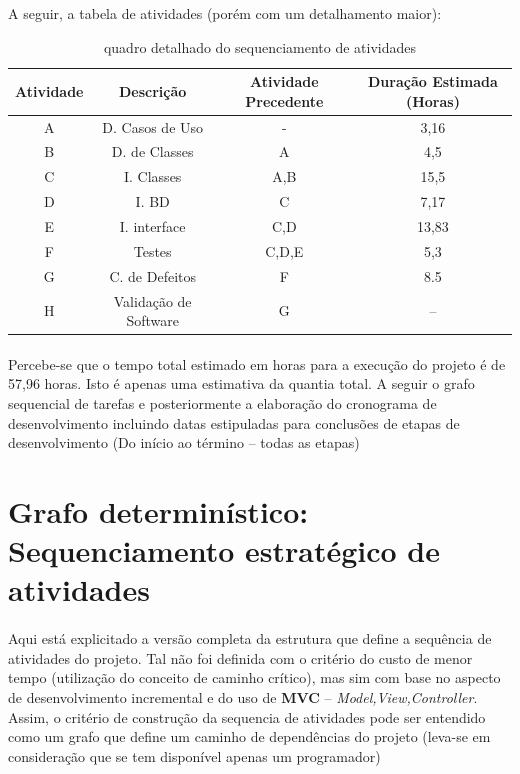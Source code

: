\documentclass[12pt,a4paper]{article}
\begin{document}
		
		A seguir, a tabela de atividades (porém com um detalhamento maior): 
		
		
		\begin{table}[!ht]
				\centering
				\begin{tabular}{|c|c|c|c|}
					\hline 
					Atividade & Descrição& Atividade Precedente & Duração Estimada (Horas) \\ 
					\hline 
					A & D. Casos de Uso & - & 3,16 \\ 
					\hline 
					B & D. de Classes& A & 4,5 \\         
					\hline 
					C & I. Classes& A,B & 15,5 \\ 
					\hline 
					D & I. BD& C & 7,17 \\ 
					\hline 
					E & I. interface & C,D & 13,83 \\ 
					\hline 	
					F & Testes & C,D,E &  5,3 \\
					\hline
					G & C. de Defeitos & F & 8.5 \\
					\hline 
					H & Validação de Software & G & -- \\ \hline 
					
				\end{tabular}	
				\caption{quadro detalhado do sequenciamento de atividades}
		\end{table}
		\paragraph{} Percebe-se que o tempo total estimado em horas para a execução do projeto é de 57,96 horas. Isto é apenas uma estimativa da quantia total. A seguir o grafo sequencial de tarefas e posteriormente a elaboração do cronograma de desenvolvimento incluindo datas estipuladas para conclusões de etapas de desenvolvimento (Do início ao término -- todas as etapas)
		
		\section{Grafo determinístico: Sequenciamento estratégico de atividades}
		\paragraph{} Aqui está explicitado a versão completa da estrutura que define a sequência de atividades do projeto. Tal não foi definida com o critério do custo de menor tempo (utilização do conceito de caminho crítico), mas sim com base no aspecto de desenvolvimento incremental e do uso de \textbf{MVC} -- \textit{Model,View,Controller}. Assim, o critério de construção da sequencia de atividades pode ser entendido como um grafo que define um caminho de dependências do projeto (leva-se em consideração que se tem disponível apenas um programador)
		
\end{document}
